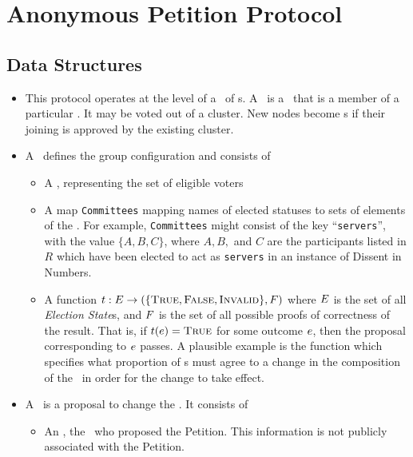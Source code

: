 \section{Anonymous Petition Protocol}
\subsection{Data Structures}
\begin{itemize}
  \item This protocol operates at the level of a \KwCluster~of
    \KwNode s.  A \KwPeer~is a \KwNode~that is a member of a
    particular \KwCluster. It may be voted out of a cluster. New nodes
    become \KwPeer s if their joining is approved by the existing cluster.

  \item A \KwManifest~defines the group configuration and consists of
  \begin{itemize}
    \item A \KwRoster, representing the set of eligible voters
    \item A map \texttt{Committees} mapping names of elected statuses to sets of
      elements of the \KwRoster. For example, \texttt{Committees} might
      consist of the key ``\texttt{servers}'', with the value $\{A, B, C\}$,
      where $A, B,$ and $C$ are the participants listed in $R$ which have been
      elected to act as \texttt{servers} in an instance of Dissent in
      Numbers.
    \item A function $t : E \to (\{\textsc{True}, \textsc{False}, \textsc{Invalid}\}, F)$
      where $E$ is the set of all \emph{Election State}s, and
      $F$ is the set of all possible proofs of correctness of the result.
      That is, if $t(e) = \textsc{True}$ for some outcome
      $e$, then the proposal corresponding to $e$
      passes.  A plausible example is the function which specifies what
      proportion of \KwPeer s must agree to a change in the composition of the
      \KwRoster~in order for the change to take effect.
  \end{itemize}
  \item A \StructPetition~is a proposal to change the \KwManifest. It
    consists of
    \begin{itemize}
      \item An \StructInstigator, the \KwPeer~who proposed the
        Petition. This information is not publicly associated with
        the Petition.

\end{itemize}
\end{itemize}
